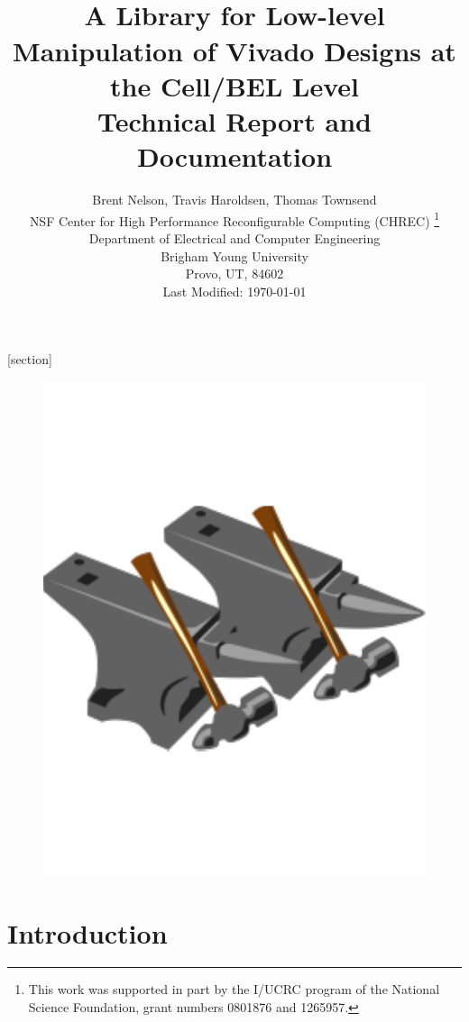 \documentclass[10pt]{article}
\begin{document}
[section]

\date{}
\title{{\bf \Huge {}}\\[0.1in]
A Library for Low-level Manipulation 
of Vivado Designs at the Cell/BEL Level\\[0.3in]
Technical Report and Documentation\\[0.1in]
}
\author{\Large Brent Nelson, Travis Haroldsen, Thomas Townsend\\[0.2in] \large NSF Center for High Performance Reconfigurable Computing (CHREC)
\thanks{This work was supported in part by the I/UCRC program of the National
 Science Foundation, grant numbers 0801876 and 1265957.}\\
\large Department of Electrical and Computer Engineering  \\
\large  Brigham Young University \\
\large  Provo, UT, 84602 \\[0.7in]
\large Last Modified: \today \\[0.05in]
}


\maketitle
\begin{figure}[H]
\centering
\includegraphics[width=0.4\columnwidth]{logo}
\end{figure}
\newpage
\tableofcontents


% 

\newpage
\section{Introduction}
\end{document}

